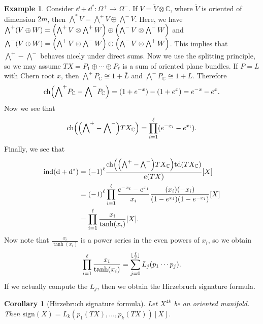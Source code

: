 \documentclass[leqno, openany]{memoir}
\DeclarePairedDelimiter{\floor}{\lfloor}{\rfloor}
\newtheorem{cor}[thm]{Corollary}
\theoremstyle{definition}
\newtheorem{exm}[thm]{Example}
\theoremstyle{remark}
\theoremstyle{plain}
\theoremstyle{definition}
\theoremstyle{remark}
\newcommand{\C}{\mathbb{C}}
\newcommand{\mr}[1]{\mathrm{#1}}
\newcommand{\ol}[1]{\overline{#1}}
\newcommand{\wt}[1]{\widetilde{#1}}
\DeclareMathOperator{\ind}{ind}
\begin{document}
\begin{exm}
    Consider $\dd + \dd^* \colon \Omega^+ \to \Omega^-$. If $V = \wt{V} \otimes \C$, where $\wt{V}$ is oriented of dimension $2m$, then $\bigwedge^* V = \bigwedge^+ V \oplus \bigwedge^- V$. Here, we have $\bigwedge^+(V \oplus W) = \qty(\bigwedge^+ V \otimes \bigwedge^+ W) \oplus \qty(\bigwedge^- V \otimes \bigwedge^- W)$ and $\bigwedge^-(V \oplus W) = \qty(\bigwedge^+ V \otimes \bigwedge^- W) \oplus \qty(\bigwedge^- V \otimes \bigwedge^+ W)$. This implies that $\bigwedge^+ - \bigwedge^-$ behaves nicely under direct sums. Now we use the splitting principle, so we may assume $TX = P_1 \oplus \cdots \oplus P_{\ell}$ is a sum of oriented plane bundles. If $P = L$ with Chern root $x$, then $\bigwedge^+ P_{\C} \cong 1 + \ol{L}$ and $\bigwedge^- P_{\C} \cong 1 + L$. Therefore
    \[ \mr{ch}\qty({\bigwedge}^+ P_{\C} - {\bigwedge}^- P_{\C}) = (1+e^{-x}) - (1+e^x) = e^{-x} - e^x. \]
    Now we see that
    \[ \mr{ch} \qty(\qty({\bigwedge}^+ - {\bigwedge}^-) TX_{\C}) = \prod_{i=1}^{\ell} (e^{-x_i} - e^{x_i}). \]
    Finally, we see that
    \begin{align*}
        \ind(\dd + \dd^*) &= {(-1)}^{\ell} \frac{\mr{ch}\qty(\qty(\bigwedge^+ - \bigwedge^-) TX_{\C}) \mr{td}(TX_{\C})}{e(TX)} [X] \\
                          &= {(-1)}^{\ell} \prod_{i=1}^{\ell} \frac{e^{-x_i} - e^{x_i}}{x_i} \frac{(x_i)(-x_i)}{(1-e^{x_i})(1-e^{-x_i})} [X] \\
                          &= \prod_{i=1}^{\ell} \frac{x_i}{\tanh(x_i)} [X].
    \end{align*}
    Now note that $\frac{x_i}{\tanh(x_i)}$ is a power series in the even powers of $x_i$, so we obtain
    \[ \prod_{i=1}^{\ell} \frac{x_i}{\tanh(x_i)} = \sum_{j=0}^{\floor{\frac{\ell}{2}}} L_j(p_1 \cdots p_j). \]
    If we actually compute the $L_j$, then we obtain the Hirzebruch signature formula.
\end{exm}

\begin{cor}[Hirzebruch signature formula]
    Let $X^{4k}$ be an oriented manifold. Then $\mr{sign}(X) = L_k(p_1(TX), \ldots, p_k(TX))[X]$.
\end{cor}
\end{document}
